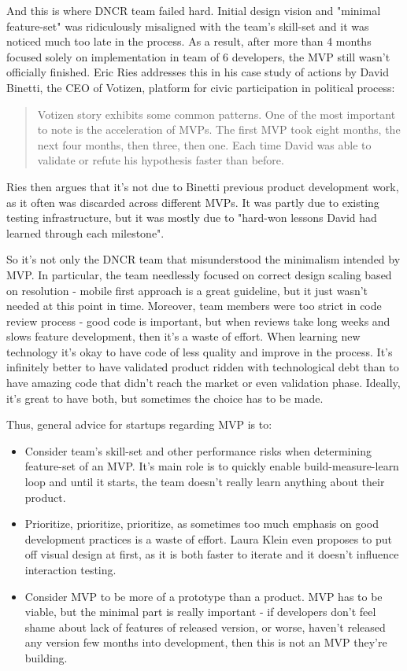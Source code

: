 \documentclass{article}
\begin{document}
And this is where DNCR team failed hard. Initial design vision and "minimal feature-set" was ridiculously misaligned with the team's skill-set and it was noticed much too late in the process. As a result, after more than 4 months focused solely on implementation in team of 6 developers, the MVP still wasn't officially finished. Eric Ries \citep{ries2011lean} addresses this in his case study of actions by David Binetti, the CEO of Votizen, platform for civic participation in political process:
\begin{quote}
Votizen story exhibits some common patterns. One of the most important to note is the acceleration of MVPs. The first MVP took eight months, the next four months, then three, then one. Each time David was able to validate or refute his hypothesis faster than before. 
\end{quote}
Ries then argues that it's not due to Binetti previous product development work, as it often was discarded across different MVPs. It was partly due to existing testing infrastructure, but it was mostly due to "hard-won lessons David had learned through each milestone".

So it's not only the DNCR team that misunderstood the minimalism intended by MVP. In particular, the team needlessly focused on correct design scaling based on resolution - mobile first approach is a great guideline, but it just wasn't needed at this point in time. Moreover, team members were too strict in code review process - good code is important, but when reviews take long weeks and slows feature development, then it's a waste of effort. When learning new technology it's okay to have code of less quality and improve in the process. It's infinitely better to have validated product ridden with technological debt than to have amazing code that didn't reach the market or even validation phase. Ideally, it's great to have both, but sometimes the choice has to be made.

Thus, general advice for startups regarding MVP is to:
\begin{itemize}
\item Consider team's skill-set and other performance risks when determining feature-set of an MVP. It's main role is to quickly enable build-measure-learn loop and until it starts, the team doesn't really learn anything about their product.
\item Prioritize, prioritize, prioritize, as sometimes too much emphasis on good development practices is a waste of effort. Laura Klein \citep{klein2013ux} even proposes to put off visual design at first, as it is both faster to iterate and it doesn't influence interaction testing.
\item Consider MVP to be more of a prototype than a product. MVP has to be viable, but the minimal part is really important - if developers don't feel shame about lack of features of released version, or worse, haven't released any version few months into development, then this is not an MVP they're building.
\end{itemize}
\end{document}
